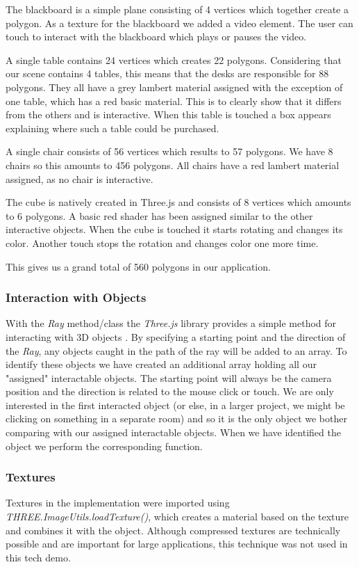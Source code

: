 \documentclass[12pt,journal,compsoc]{IEEEtran}
\begin{document}
The blackboard is a simple plane consisting of 4 vertices which together create a polygon. As a texture for the blackboard we added a video element. The user can touch to interact with the blackboard which plays or pauses the video.

A single table contains 24 vertices which creates 22 polygons. Considering that our scene contains 4 tables, this means that the desks are responsible for 88 polygons. They all have a grey lambert material assigned with the exception of one table, which has a red basic material. This is to clearly show that it differs from the others and is interactive. When this table is touched a box appears explaining where such a table could be purchased.

A single chair consists of 56 vertices which results to 57 polygons. We have 8 chairs so this amounts to 456 polygons. All chairs have a red lambert material assigned, as no chair is interactive.

The cube is natively created in Three.js and consists of 8 vertices which amounts to 6 polygons. A basic red shader has been assigned similar to the other interactive objects. When the cube is touched it starts rotating and changes its color. Another touch stops the rotation and changes color one more time.

This gives us a grand total of 560 polygons in our application. 


\subsubsection{Interaction with Objects}
With the \textit{Ray} method/class the \textit{Three.js} library provides a simple method for interacting with 3D objects \cite{ThreeJSRay}. By specifying a starting point and the direction of the \textit{Ray}, any objects caught in the path of the ray will be added to an array. To identify these objects we have created an additional array holding all our "assigned" interactable objects. The starting point will always be the camera position and the direction is related to the mouse click or touch.
	We are only interested in the first interacted object (or else, in a larger project, we might be clicking on something in a separate room) and so it is the only object we bother comparing with our assigned interactable objects. When we have identified the object we perform the corresponding function.

\subsubsection{Textures}
Textures in the implementation were imported using \textit{THREE.ImageUtils.loadTexture()}, which creates a material based on the texture and combines it with the object. Although compressed textures are technically possible and are important for large applications, this technique was not used in this tech demo.
\end{document}
